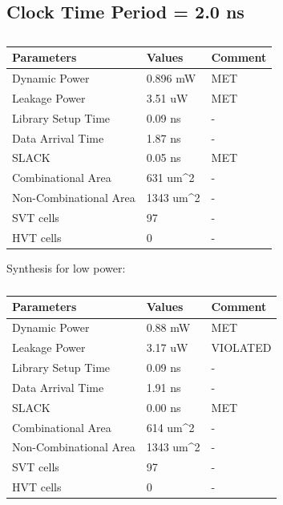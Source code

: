 \documentclass[11pt,a4paper]{article}
\begin{document}
\newpage
\subsection{Clock Time Period = 2.0 ns}
\begin{table}[htbp]
\begin{center}
\begin{tabular}{|l|l|l|}
\hline
\textbf{Parameters}	& \textbf{Values}		& \textbf{Comment}\\ \hline
Dynamic Power				&	0.896 mW			& MET\\ \hline
Leakage Power 			&	3.51 uW				& MET \\ \hline
Library Setup Time  & 0.09 ns				& - \\ \hline
Data Arrival Time		& 1.87 ns				& - \\ \hline
SLACK								& 0.05 ns				& MET \\ \hline
Combinational Area	& 631 um^2			& - \\ \hline
Non-Combinational Area	& 1343 um^2	& - \\ \hline
SVT cells						& 97						& - \\ \hline
HVT cells						& 0							& - \\ \hline
\end{tabular}
\end{center}
\caption{}
\label{tab:syn2.0.1}
\end{table}

Synthesis for low power:

\begin{table}[htbp]
\begin{center}
\begin{tabular}{|l|l|l|}
\hline
\textbf{Parameters}	& \textbf{Values}		& \textbf{Comment}\\ \hline
Dynamic Power				&	0.88 mW				& MET\\ \hline
Leakage Power 			&	3.17 uW				& VIOLATED\\ \hline
Library Setup Time  & 0.09 ns				& - \\ \hline
Data Arrival Time		& 1.91 ns				& - \\ \hline
SLACK								& 0.00 ns			& MET\\ \hline
Combinational Area	& 614 um^2			& - \\ \hline
Non-Combinational Area	& 1343 um^2	& - \\ \hline
SVT cells						& 97						& - \\ \hline
HVT cells						& 0							& - \\ \hline
\end{tabular}
\end{center}
\caption{}
\label{tab:syn2.0.2}
\end{table}
\end{document}
